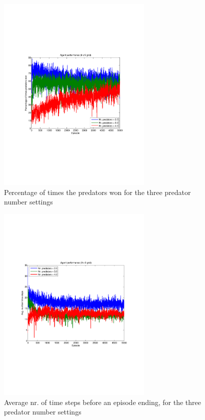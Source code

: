 \begin{figure}[htb]
\centering
\includegraphics[bb = 0.6in 3in 7.9in 8in,clip,width=0.66\textwidth]
{IQLgrid9by9percentageWinning5000episodesavg200trials.pdf} 
\caption{Percentage of times the predators won for the three predator number settings}
\label{fig:IQLpercentagePlot}
\end{figure}
\begin{figure}[htb]
\centering
\includegraphics[bb = 0.6in 2.9in 7.9in 8.2in,clip,width=0.66\textwidth]
{IQLgrid9by9nrTimeSteps5000episodesavg200trials.pdf} 
\caption{Average nr. of time steps before an episode ending, for the three predator number settings}
\label{fig:IQLnrTimeSteps}
\end{figure}


